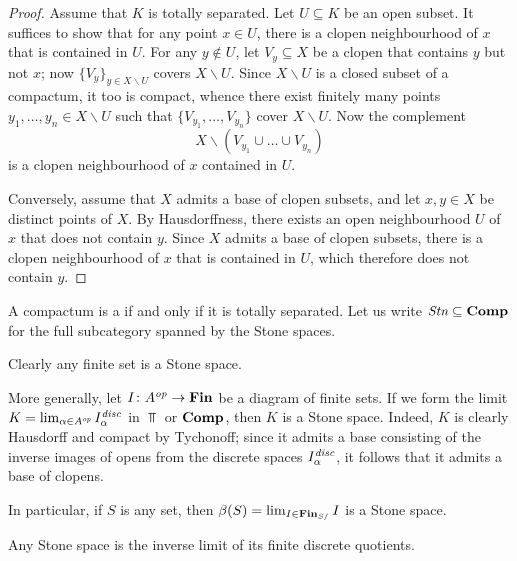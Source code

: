 \begin{proof}
	Assume that $ K $ is totally separated.
	Let $ U \subseteq K $ be an open subset.
	It suffices to show that for any point $ x \in U $, there is a clopen neighbourhood of $ x $ that is contained in $ U $.
	For any $ y \notin U $, let $ V_y \subseteq X $ be a clopen that contains $ y $ but not $ x $;
	now $ \{ V_y \}_{y \in X \smallsetminus U} $ covers $ X \smallsetminus U $.
	Since $ X \smallsetminus U $ is a closed subset of a compactum, it too is compact, whence there exist finitely many points $ y_1, \dots, y_n \in X \smallsetminus U $ such that $ \{ V_{y_1}, \dots, V_{y_n} \} $ cover $ X \smallsetminus U $.
	Now the complement 
	\[
		X \smallsetminus (V_{y_1} \cup \dots \cup V_{y_n})
	\]
	is a clopen neighbourhood of $ x $ contained in $ U $.

	Conversely, assume that $ X $ admits a base of clopen subsets, and let $ x, y \in X $ be distinct points of $ X $.
	By Hausdorffness, there exists an open neighbourhood $ U $ of $ x $ that does not contain $ y $. 
	Since $ X $ admits a base of clopen subsets, there is a clopen neighbourhood of $ x $ that is contained in $ U $, which therefore does not contain $ y $.
\end{proof}

\begin{dfn}
	A compactum is a  if and only if it is totally separated.
	Let us write $ \textit{Stn} \subseteq \textbf{\textup{Comp}} $ for the full subcategory spanned by the Stone spaces.
\end{dfn}

\begin{exm}
	Clearly any finite set is a Stone space.

	More generally, let $ I \colon A^{\textit{op}} \to \textbf{\textup{Fin}} $ be a diagram of finite sets.
	If we form the limit $ K = \lim_{\alpha \in A^{\textit{op}}} I_{\alpha}^{\textit{disc}}$ in $ \Top $ or $ \textbf{\textup{Comp}} $, then $ K $ is a Stone space.
	Indeed, $ K $ is clearly Hausdorff and compact by Tychonoff;
	since it admits a base consisting of the inverse images of opens from the discrete spaces $ I_{\alpha}^{\textit{disc}} $, it follows that it admits a base of clopens.

	In particular, if $ S $ is any set, then $ \beta(S) = \lim_{I \in \textbf{\textup{Fin}}_{S/}} I $ is a Stone space.
\end{exm}

\begin{lem}
	Any Stone space is the inverse limit of its finite discrete quotients.
\end{lem}

